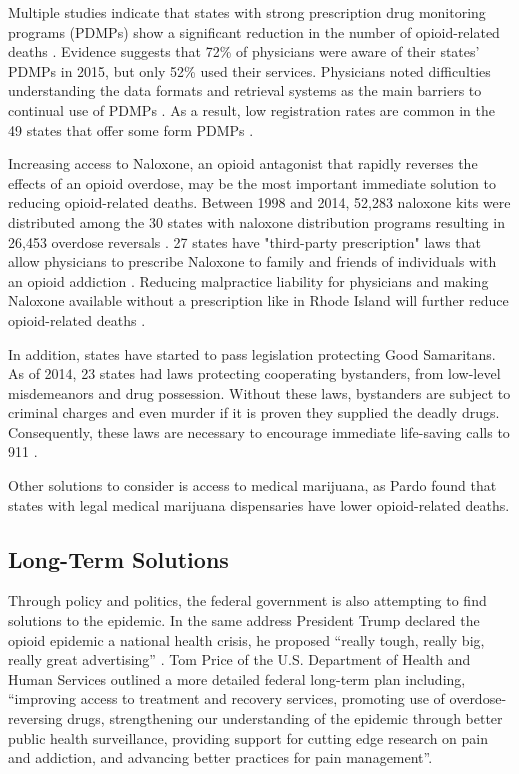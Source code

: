 \documentclass[sigconf]{acmart}
\begin{document}
Multiple studies indicate that states with strong prescription drug monitoring programs (PDMPs) show a significant reduction in the number of opioid-related deaths \cite{pardo01} \cite{patrick01}. Evidence suggests that 72\% of physicians were aware of their states' PDMPs in 2015, but only 52\% used their services. Physicians noted difficulties understanding the data formats and retrieval systems as the main barriers to continual use of PDMPs \cite{Rutkow01}. As a result, low registration rates are common in the 49 states that offer some form PDMPs \cite{Hawk01}.

Increasing access to Naloxone, an opioid antagonist that rapidly reverses the effects of an opioid overdose, may be the most important immediate solution to reducing opioid-related deaths. Between 1998 and 2014, 52,283 naloxone kits were distributed among the 30 states with naloxone distribution programs resulting in 26,453 overdose reversals \cite{Hawk01}. 27 states have "third-party prescription" laws that allow physicians to prescribe Naloxone to family and friends of individuals with an opioid addiction \cite{Hawk01}. Reducing malpractice liability for physicians and making Naloxone available without a prescription like in Rhode Island will further reduce opioid-related deaths \cite{Hawk01}.

In addition, states have started to pass legislation protecting Good Samaritans. As of 2014, 23 states had laws protecting cooperating bystanders, from low-level misdemeanors and drug possession. Without these laws, bystanders are subject to criminal charges and even murder if it is proven they supplied the deadly drugs. Consequently, these laws are necessary to encourage immediate life-saving calls to 911 \cite{Burris01} \cite{Hawk01}. 

Other solutions to consider is access to medical marijuana, as Pardo \cite{pardo01} found that states with legal medical marijuana dispensaries have lower opioid-related deaths.

\subsection{Long-Term Solutions}
Through policy and politics, the federal government is also attempting to find solutions to the epidemic. In the same address President Trump declared the opioid epidemic a national health crisis, he proposed ``really tough, really big, really great advertising'' \cite{opsis6}. Tom Price of the U.S. Department of Health and Human Services outlined a more detailed federal long-term plan including, ``improving access to treatment and recovery services, promoting use of overdose-reversing drugs, strengthening our understanding of the epidemic through better public health surveillance, providing support for cutting edge research on pain and addiction, and advancing better practices for pain management''\cite{opsis7}. 
\end{document}
